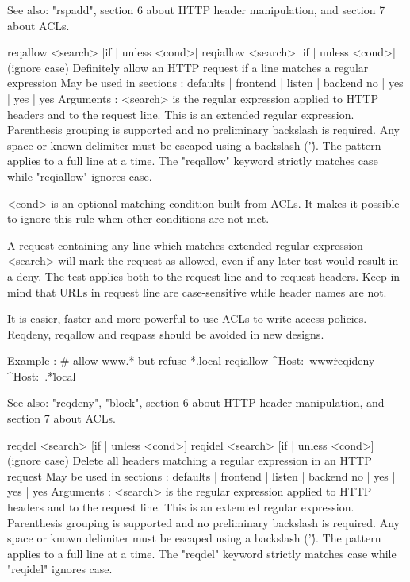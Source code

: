   See also: "rspadd", section 6 about HTTP header manipulation, and section 7
            about ACLs.


reqallow  <search> [{if | unless} <cond>]
reqiallow <search> [{if | unless} <cond>] (ignore case)
  Definitely allow an HTTP request if a line matches a regular expression
  May be used in sections :   defaults | frontend | listen | backend
                                 no    |    yes   |   yes  |   yes
  Arguments :
    <search>  is the regular expression applied to HTTP headers and to the
              request line. This is an extended regular expression. Parenthesis
              grouping is supported and no preliminary backslash is required.
              Any space or known delimiter must be escaped using a backslash
              ('\'). The pattern applies to a full line at a time. The
              "reqallow" keyword strictly matches case while "reqiallow"
              ignores case.

    <cond>    is an optional matching condition built from ACLs. It makes it
              possible to ignore this rule when other conditions are not met.

  A request containing any line which matches extended regular expression
  <search> will mark the request as allowed, even if any later test would
  result in a deny. The test applies both to the request line and to request
  headers. Keep in mind that URLs in request line are case-sensitive while
  header names are not.

  It is easier, faster and more powerful to use ACLs to write access policies.
  Reqdeny, reqallow and reqpass should be avoided in new designs.

  Example :
     # allow www.* but refuse *.local
     reqiallow ^Host:\ www\.
     reqideny  ^Host:\ .*\.local

  See also: "reqdeny", "block", section 6 about HTTP header manipulation, and
            section 7 about ACLs.


reqdel  <search> [{if | unless} <cond>]
reqidel <search> [{if | unless} <cond>]  (ignore case)
  Delete all headers matching a regular expression in an HTTP request
  May be used in sections :   defaults | frontend | listen | backend
                                 no    |    yes   |   yes  |   yes
  Arguments :
    <search>  is the regular expression applied to HTTP headers and to the
              request line. This is an extended regular expression. Parenthesis
              grouping is supported and no preliminary backslash is required.
              Any space or known delimiter must be escaped using a backslash
              ('\'). The pattern applies to a full line at a time. The "reqdel"
              keyword strictly matches case while "reqidel" ignores case.

